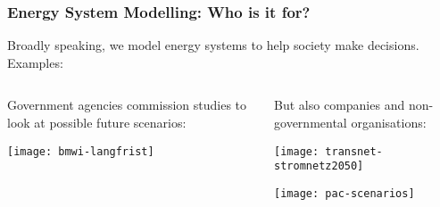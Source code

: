 \documentclass[10pt,aspectratio=169,dvipsnames]{beamer}
\begin{document}
\begin{frame}
  \frametitle{Energy System Modelling: Who is it for?}

  Broadly speaking, we model energy systems to help \alert{society} make decisions. Examples:


\begin{columns}[T]
  \begin{column}{6.5cm}
    Government agencies commission studies to look at possible future
    scenarios:

    \vspace{.2cm}

    \texttt{[image: bmwi-langfrist]}

  \end{column}
  \begin{column}{6.5cm}

      But also companies and non-governmental organisations:

    \vspace{.2cm}

  \texttt{[image: transnet-stromnetz2050]}

    \vspace{.5cm}

  \texttt{[image: pac-scenarios]}

  \end{column}
\end{columns}

\end{frame}
\end{document}
